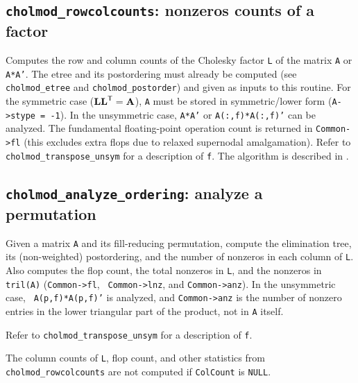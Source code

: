 \documentclass[11pt]{article}
\newcommand{\m}[1]{{\bf{#1}}}       %
\newcommand{\tr}{^{\sf T}}          %
\begin{document}
\subsection{{\tt cholmod\_rowcolcounts}: nonzeros counts of a factor}


Computes the row and column counts of the Cholesky factor {\tt L} of the matrix
{\tt A} or {\tt A*A'}.  The etree and its postordering must already be computed
(see {\tt cholmod\_etree} and {\tt cholmod\_postorder}) and given as inputs to
this routine.  For the symmetric case ($\m{LL}\tr=\m{A}$), {\tt A} must be
stored in symmetric/lower form ({\tt A->stype = -1}).  In the unsymmetric case,
{\tt A*A'} or {\tt A(:,f)*A(:,f)'} can be analyzed.  The fundamental
floating-point operation count is returned in {\tt Common->fl} (this excludes
extra flops due to relaxed supernodal amalgamation).  Refer to {\tt
cholmod\_transpose\_unsym} for a description of {\tt f}.  The algorithm is
described in \cite{GilbertLiNgPeyton01,GilbertNgPeyton94}.

%

\subsection{{\tt cholmod\_analyze\_ordering}: analyze a permutation}


Given a matrix {\tt A} and its fill-reducing permutation, compute the
elimination tree, its (non-weighted) postordering, and the number of nonzeros
in each column of {\tt L}.  Also computes the flop count, the total nonzeros in
{\tt L}, and the nonzeros in {\tt tril(A)} ({\tt Common->fl}, {\tt
Common->lnz}, and {\tt Common->anz}).  In the unsymmetric case, {\tt
A(p,f)*A(p,f)'} is analyzed, and {\tt Common->anz} is the number of nonzero
entries in the lower triangular part of the product, not in {\tt A} itself.

Refer to {\tt cholmod\_transpose\_unsym} for a description of {\tt f}.

The column counts of {\tt L}, flop count, and other statistics from
{\tt cholmod\_rowcolcounts} are not computed if {\tt ColCount} is {\tt NULL}.
\end{document}
